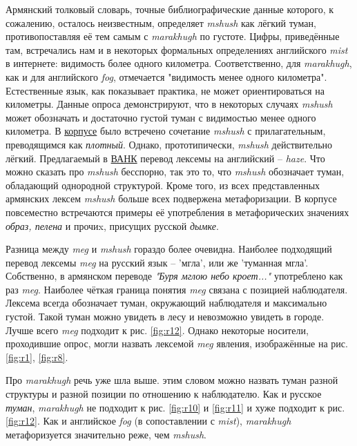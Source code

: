 \par Армянский толковый словарь, точные библиографические данные которого, к сожалению, осталось неизвестным, определяет \textit{mshush} как лёгкий туман, противопоставляя её тем самым с \textit{marakhugh} по густоте. Цифры, приведённые там, встречались нам и в некоторых формальных определениях английского \textit{mist} в интернете: видимость более одного километра. Соответственно, для \textit{marakhugh}, как и для английского \textit{fog}, отмечается "видимость менее одного километра". Естественные язык, как показывает практика, не может ориентироваться на километры. Данные опроса демонстрируют, что в некоторых случаях \textit{mshush} может обозначать и достаточно густой туман с видимостью менее одного километра. В \hyperlink{eanc}{корпусе} было встречено сочетание \textit{mshush} с прилагательным, преводящимся как \textit{плотный}. Однако, прототипически, \textit{mshush} действительно лёгкий. Предлагаемый в \hyperlink{eanc}{ВАНК} перевод лексемы на английский – \textit{haze}. Что можно сказать про \textit{mshush} бесспорно, так это то, что \textit{mshush} обозначает туман, обладающий однородной структурой. Кроме того, из всех представленных армянских лексем \textit{mshush} больше всех подвержена метафоризации. В корпусе повсеместно встречаются примеры её употребления в метафорических значениях \textit{образ, пелена} и прочиx, присущих русской \textit{дымке}.
\par Разница между \textit{meg} и \textit{mshush} гораздо более очевидна. Наиболее подходящий перевод лексемы \textit{meg} на русский язык – 'мгла', или же 'туманная мгла'. Собственно, в армянском переводе \textit{"Буря мглою небо кроет..."} употреблено как раз \textit{meg}. Наиболее чёткая граница понятия \textit{meg} связана с позицией наблюдателя. Лексема всегда обозначает туман, окружающий наблюдателя и максимально густой. Такой туман можно увидеть в лесу и невозможно увидеть в городе. Лучше всего \textit{meg} подходит к рис. \ref{fig:r12}. Однако некоторые носители, проходившие опрос, могли назвать лексемой \textit{meg} явления, изображённые на рис. \ref{fig:r1}, \ref{fig:r8}.

\par Про \textit{marakhugh} речь уже шла выше. этим словом можно назвать туман разной структуры и разной позиции по отношению к наблюдателю. Как и русское \textit{туман}, \textit{marakhugh} не подходит к рис. \ref{fig:r10} и \ref{fig:r11} и хуже подходит к рис. \ref{fig:r12}. Как и английское \textit{fog} (в сопоставлении с \textit{mist}), \textit{marakhugh} метафоризуется значительно реже, чем  \textit{mshush}.

